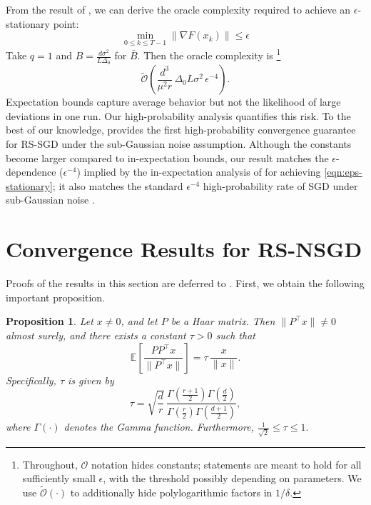 \documentclass[10pt]{article}
\newtheorem{proposition}[proposition]{Proposition}
\begin{document}
From the result of , we can derive the oracle complexity required to achieve an $\epsilon$-stationary point:
\begin{equation}
\min_{0 \le k \le T-1} \|\nabla F(x_k)\| \le \epsilon 
\label{eqn:eps-stationary}
\end{equation}
Take $q=1$ and $B=\frac{d\sigma^2}{L\Delta_0}$ for $\bar{B}$.
Then the oracle complexity 
is \footnote{Throughout, $\mathcal{O}$ notation hides constants; statements are meant to hold for all sufficiently small $\epsilon$, with the threshold possibly depending on parameters. We use $\tilde{\mathcal{O}}(\cdot)$ to additionally hide polylogarithmic factors in $1/\delta$.}
\[
\tilde{\mathcal{O}}\!\left(
\frac{d^{3}}{\mu^{2}r}\,\Delta_0L\sigma^{2}\,\epsilon^{-4}
\right).
\]
Expectation bounds capture average behavior but not the likelihood of large deviations in one run.
Our high-probability analysis quantifies this risk.
To the best of our knowledge,  provides the first high-probability convergence guarantee for RS-SGD under the sub-Gaussian noise assumption.
Although the constants become larger compared to in-expectation bounds, our result matches the $\epsilon$-dependence ($\epsilon^{-4}$) implied by the in-expectation analysis of \citet{flynn2024} for achieving \eqref{eqn:eps-stationary}; it also matches the standard $\epsilon^{-4}$ high-probability rate of SGD under sub-Gaussian noise \cite{liu2023hp}.



\section{Convergence Results for RS-NSGD}
Proofs of the results in this section are deferred to .
First, we obtain the following important proposition.

\begin{proposition}
\label{prop:tau}
Let \(x \neq 0\), and let \(P\) be a Haar matrix.
Then \(\|P^\top x\| \neq 0\) almost surely, and there exists a constant
\(\tau > 0\) such that
\[
\mathbb{E}\!\left[\frac{PP^\top x}{\|P^\top x\|}\right]
=
\tau\,\frac{x}{\|x\|}.
\]
Specifically, \(\tau\) is given by
\[
\tau
=
\sqrt{\frac{d}{r}}\,
\frac{
\Gamma\!\left(\frac{r+1}{2} \right)
\Gamma\!\left(\frac{d}{2}\right)
}{
\Gamma\!\left(\frac{r}{2}\right)
\Gamma\!\left(\frac{d+1}{2} \right)
},
\]
where $\Gamma(\cdot)$ denotes the Gamma function.
Furthermore,  $\frac{1}{\sqrt{2}} \leq \tau \leq 1.$
\end{proposition}
\end{document}
